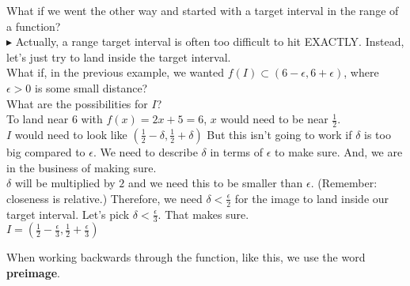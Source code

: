 \documentclass{ximera}
\begin{document}
What if we went the other way and started with a target interval in the range of a function? \\

\textbf{\textcolor{red!90!darkgray}{$\blacktriangleright$}} Actually, a range target interval is often too difficult to hit EXACTLY.  Instead, let's just try to land inside the target interval. \\



What if, in the previous example, we wanted $f(I) \subset (6-\epsilon, 6+\epsilon)$, where $\epsilon > 0$ is some small distance?  \\


What are the possibilities for $I$?  \\







To land near $6$ with $f(x) = 2x + 5 = 6$, $x$ would need to be near $\frac{1}{2}$.  \\

$I$ would need to look like $\left( \frac{1}{2} - \delta, \frac{1}{2}+ \delta \right)$  But this isn't going to work if $\delta$ is too big compared to $\epsilon$.  We need to describe $\delta$ in terms of $\epsilon$ to make sure.  And, we are in the business of making sure. \\



$\delta$ will be multiplied by $2$ and we need this to be smaller than $\epsilon$.  (Remember: closeness is relative.) Therefore, we need $\delta < \frac{\epsilon}{2}$ for the image to land inside our target interval.  Let's pick $\delta < \frac{\epsilon}{3}$.  That makes sure. \\



$I = \left( \frac{1}{2} - \frac{\epsilon}{3}, \frac{1}{2} + \frac{\epsilon}{3} \right)$




When working backwards through the function, like this, we use the word \textbf{preimage}.
\end{document}
